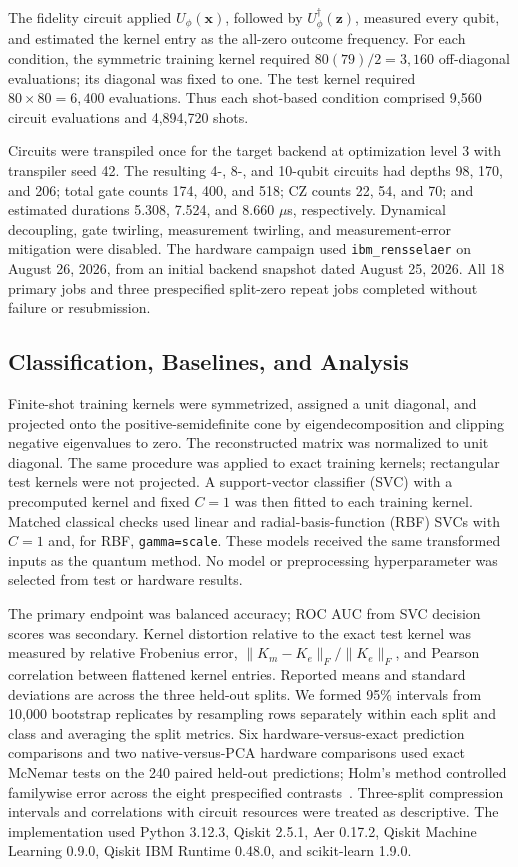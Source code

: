 The fidelity circuit applied $U_{\phi}(\mathbf{x})$, followed by $U_{\phi}^{\dagger}(\mathbf{z})$, measured every qubit, and estimated the kernel entry as the all-zero outcome frequency. For each condition, the symmetric training kernel required $80(79)/2=3,160$ off-diagonal evaluations; its diagonal was fixed to one. The test kernel required $80\times80=6,400$ evaluations. Thus each shot-based condition comprised 9,560 circuit evaluations and 4,894,720 shots.

Circuits were transpiled once for the target backend at optimization level 3 with transpiler seed 42. The resulting 4-, 8-, and 10-qubit circuits had depths 98, 170, and 206; total gate counts 174, 400, and 518; CZ counts 22, 54, and 70; and estimated durations 5.308, 7.524, and 8.660 $\mu$s, respectively. Dynamical decoupling, gate twirling, measurement twirling, and measurement-error mitigation were disabled. The hardware campaign used \texttt{ibm\_rensselaer} on August 26, 2026, from an initial backend snapshot dated August 25, 2026. All 18 primary jobs and three prespecified split-zero repeat jobs completed without failure or resubmission.

\subsection{Classification, Baselines, and Analysis}

Finite-shot training kernels were symmetrized, assigned a unit diagonal, and projected onto the positive-semidefinite cone by eigendecomposition and clipping negative eigenvalues to zero. The reconstructed matrix was normalized to unit diagonal. The same procedure was applied to exact training kernels; rectangular test kernels were not projected. A support-vector classifier (SVC) with a precomputed kernel and fixed $C=1$ was then fitted to each training kernel. Matched classical checks used linear and radial-basis-function (RBF) SVCs with $C=1$ and, for RBF, \texttt{gamma=scale}. These models received the same transformed inputs as the quantum method. No model or preprocessing hyperparameter was selected from test or hardware results.

The primary endpoint was balanced accuracy; ROC AUC from SVC decision scores was secondary. Kernel distortion relative to the exact test kernel was measured by relative Frobenius error,
$\|K_m-K_e\|_F/\|K_e\|_F$, and Pearson correlation between flattened kernel entries. Reported means and standard deviations are across the three held-out splits. We formed 95\% intervals from 10,000 bootstrap replicates by resampling rows separately within each split and class and averaging the split metrics. Six hardware-versus-exact prediction comparisons and two native-versus-PCA hardware comparisons used exact McNemar tests on the 240 paired held-out predictions; Holm's method controlled familywise error across the eight prespecified contrasts~\cite{mcnemar1947,holm1979}. Three-split compression intervals and correlations with circuit resources were treated as descriptive. The implementation used Python 3.12.3, Qiskit 2.5.1, Aer 0.17.2, Qiskit Machine Learning 0.9.0, Qiskit IBM Runtime 0.48.0, and scikit-learn 1.9.0.

